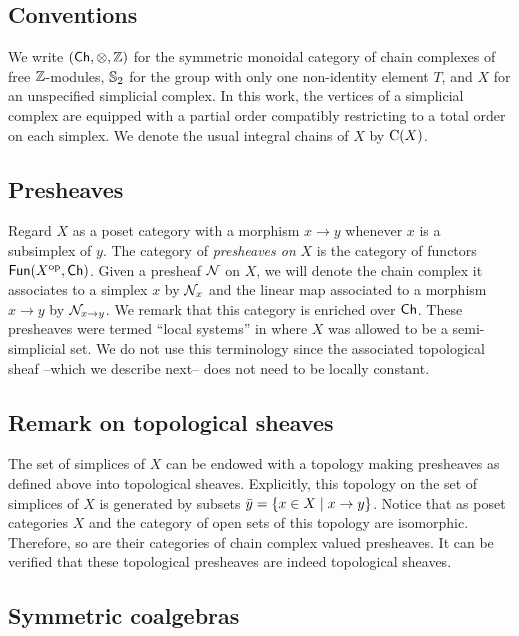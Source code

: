 
\subsection{Conventions}

We write $(\mathsf{Ch}, \otimes, \mathbb{Z})$ for the symmetric monoidal category of chain complexes of free $\mathbb{Z}$-modules, $\mathbb{S}_2$ for the group with only one non-identity element $T$, and $X$ for an unspecified simplicial complex.
In this work, the vertices of a simplicial complex are equipped with a partial order compatibly restricting to a total order on each simplex.
We denote the usual integral chains of $X$ by $\operatorname{C}(X)$.

\subsection{Presheaves}\label{ss:presheaves}

Regard $X$ as a poset category with a morphism $x \to y$ whenever $x$ is a subsimplex of $y$.
The category of \textit{presheaves on} $X$ is the category of functors $\mathsf{Fun}(X^{\mathrm{op}}, \mathsf{Ch})$.
Given a presheaf $\mathcal{N}$ on $X$, we will denote the chain complex it associates to a simplex $x$ by $\mathcal{N}_x$ and the linear map associated to a morphism $x \to y$ by $\mathcal{N}_{x \to y}$.
We remark that this category is enriched over $\mathsf{Ch}$.
These presheaves were termed ``local systems'' in \cite{ranicki1990assembly} where $X$ was allowed to be a semi-simplicial set.
We do not use this terminology since the associated topological sheaf --which we describe next-- does not need to be locally constant.

\subsection{Remark on topological sheaves}\label{ss:topological sheaf}

The set of simplices of $X$ can be endowed with a topology making presheaves as defined above into topological sheaves.
Explicitly, this topology on the set of simplices of $X$ is generated by subsets $\bar y = \{x \in X \mid x \to y\}$.
Notice that as poset categories $X$ and the category of open sets of this topology are isomorphic.
Therefore, so are their categories of chain complex valued presheaves.
It can be verified that these topological presheaves are indeed topological sheaves.

\subsection{Symmetric coalgebras}

